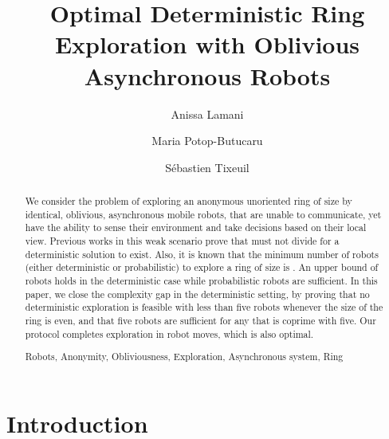 \documentclass[12pt]{llncs}
\newcommand{\keywords}[1]{\par\addvspace\baselineskip
\noindent\keywordname\enspace\ignorespaces#1}
\begin{document}
\title{Optimal Deterministic Ring Exploration with Oblivious Asynchronous Robots}
\author{Anissa Lamani \and Maria Potop-Butucaru \and
S\'{e}bastien Tixeuil
}
\maketitle
\begin {abstract}
We consider the problem of exploring an anonymous unoriented ring of size  by  identical, oblivious, asynchronous mobile robots, that are unable to communicate, yet have the ability to sense their environment and take decisions based on their local view. Previous works in this weak scenario prove that  must not divide  for a deterministic solution to exist. Also, it is known that the minimum number of robots (either deterministic or probabilistic) to explore a ring of size  is . An upper bound of  robots holds in the deterministic case while  probabilistic robots are sufficient.
In this paper, we close the complexity gap in the deterministic setting, by proving that no deterministic exploration is feasible with less than five robots whenever the size of the ring is even, and that five robots are sufficient for any  that is coprime with five. Our protocol completes exploration in  robot moves, which is also optimal.

\keywords {Robots, Anonymity, Obliviousness, Exploration, Asynchronous system, Ring} 
\end {abstract}
\section{Introduction}\label{sec:Introduction}
\end{document}
